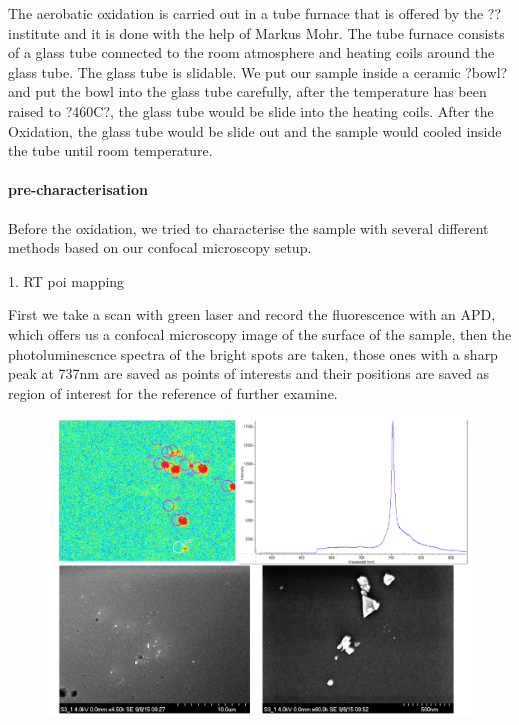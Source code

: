 The aerobatic oxidation is carried out in a tube furnace that is offered by the ?? institute and it is done with the help of Markus Mohr. The tube furnace consists of a glass tube connected to the room atmosphere and heating coils around the glass tube. The glass tube is slidable. We put our sample inside a ceramic ?bowl? and put the bowl into the glass tube carefully, after the temperature has been raised to ?460C?, the glass tube would be slide into the heating coils. After the Oxidation, the glass tube would be slide out and the sample would cooled inside the tube until room temperature.

\paragraph{pre-characterisation}
Before the oxidation, we tried to characterise the sample with several different methods based on our confocal microscopy setup.

1. RT poi mapping

First we take a scan with green laser and record the fluorescence with an APD, which offers us a confocal microscopy image of the surface of the sample, then the photoluminescnce spectra of the bright spots are taken, those ones with a sharp peak at 737nm are saved as points of interests and their positions are saved as region of interest for the reference of further examine.
\FloatBarrier
\begin{figure}[h]
\centering
\includegraphics[width=1\linewidth]{Figures/pic/RTPL}
\caption{}
\label{fig:2015-09-07-ow-capture-20150907151210-744-1}
\end{figure}

